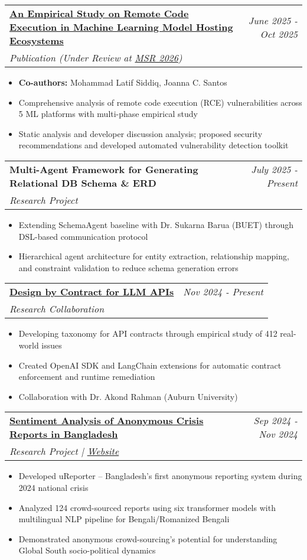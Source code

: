 \documentclass[a4paper,11pt]{article}
\makeatletter
\newcommand{\resumeProject}[4]{
\vspace{0.5mm}\item
    \begin{tabular*}{0.98\textwidth}[t]{l@{\extracolsep{\fill}}r}
        \textbf{#1} & \textit{\footnotesize{#3}} \\
        \footnotesize{\textit{#2}} & \footnotesize{#4}
    \end{tabular*}
    \vspace{-2.4mm}
}
\newcommand{\resumeItemListStart}{\begin{itemize}[leftmargin=*,labelsep=1mm,itemsep=0.5mm]}
\newcommand{\resumeItemListEnd}{\end{itemize}\vspace{-2mm}}
\makeatother
\begin{document}
\resumeProject
  {\href{https://tanzimhromel.com/assets/pdf/ml-rce-study.pdf}{An Empirical Study on Remote Code Execution in Machine
Learning Model Hosting Ecosystems}}
  {Publication (Under Review at \href{https://2026.msrconf.org}{MSR 2026})}
  {June 2025 - Oct 2025}
  {{}}
\resumeItemListStart
  \item \textbf{Co-authors:} Mohammad Latif Siddiq, Joanna C. Santos
  \item Comprehensive analysis of remote code execution (RCE) vulnerabilities across 5 ML platforms with multi-phase empirical study
  \item Static analysis and developer discussion analysis; proposed security recommendations and developed automated vulnerability detection toolkit
\resumeItemListEnd

\resumeProject
  {Multi-Agent Framework for Generating Relational DB Schema \& ERD}
  {Research Project}
  {July 2025 - Present}
  {{}}
\resumeItemListStart
  \item Extending SchemaAgent baseline with Dr. Sukarna Barua (BUET) through DSL-based communication protocol
  \item Hierarchical agent architecture for entity extraction, relationship mapping, and constraint validation to reduce schema generation errors
\resumeItemListEnd

\resumeProject
  {\href{https://tanzimhromel.com/assets/pdf/llm-api-contracts.pdf}{Design by Contract for LLM APIs}}
  {Research Collaboration}
  {Nov 2024 - Present}
  {}
\resumeItemListStart
  \item Developing taxonomy for API contracts through empirical study of 412 real-world issues
  \item Created OpenAI SDK and LangChain extensions for automatic contract enforcement and runtime remediation
  \item Collaboration with Dr. Akond Rahman (Auburn University)
\resumeItemListEnd

\resumeProject
  {\href{https://tanzimhromel.com/assets/pdf/Ureporter.pdf}{Sentiment Analysis of Anonymous Crisis Reports in Bangladesh}}
  {Research Project | \href{https://ureporter.cse.buet.ac.bd/about_us}{Website}}
  {Sep 2024 - Nov 2024}
  {}
\resumeItemListStart
  \item Developed uReporter -- Bangladesh's first anonymous reporting system during 2024 national crisis
  \item Analyzed 124 crowd-sourced reports using six transformer models with multilingual NLP pipeline for Bengali/Romanized Bengali
  \item Demonstrated anonymous crowd-sourcing's potential for understanding Global South socio-political dynamics
\resumeItemListEnd
\end{document}
